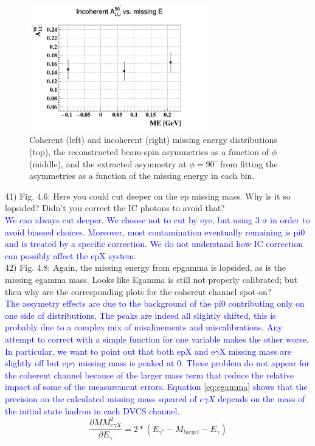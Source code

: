 \begin{figure}[tbp]
   \hspace{+0.7cm}
   \includegraphics[height=5.5cm]{fig/incoh_ME_alpha.png}


   \caption{Coherent (left) and incoherent (right) missing energy distributions 
   (top), the reconstructed beam-spin asymmetries as a function of $\phi$ 
(middle), and the extracted asymmetry at $\phi = 90 ^{\circ}$ from fitting the 
asymmetries as a function of the missing energy in each bin. }
   \label{fig:coherent_ME_bins}
    \end{figure}

41) Fig. 4.6: Here you could cut deeper on the ep missing mass.
Why is it so lopsided? Didn't you correct the IC photons to avoid that?  \\
\textcolor{blue}{We can always cut deeper. We choose not to cut by eye, but 
   using 3 $\sigma$ in order to avoid biassed choices. Moreover, most 
   contamination eventually remaining is pi0 and is treated by a specific 
correction. We do not understand how IC correction can possibly affect the epX 
system.}\\

42) Fig. 4.8: Again, the missing energy from epgamma is lopsided, as is the 
missing egamma mass. Looks like Egamma is still not properly calibrated; but 
then why are the corresponding plots for the coherent channel spot-on? \\
\textcolor{blue}{The assymetry effects are due to the background of the pi0
contributing only on one side of distributions. The peaks are indeed all 
slightly shifted, this is probably due to a complex mix of misalinements and 
miscalibrations. Any attempt to correct with a simple function for one 
variable makes the other worse. In particular, we want to point out that both 
epX and e$\gamma$X missing mass are slightly off but ep$\gamma$ missing mass 
is peaked at 0. These problem do not appear for the coherent channel because
of the larger mass term that reduce the relative impact of some of the
measurement errors. Equation \ref{eq:egamma} shows that the precision on the 
calculated missing mass squared of $e\gamma X$ depends on the mass of the 
initial state hadron in each DVCS channel.}\\
   \begin{equation}
      \frac{\partial MM^2_{e\gamma X}}{\partial E_{\gamma}}
      = 2*(E_{\gamma^{*}}-M_{target} - E_{\gamma})
      \label{eq:egamma}
   \end{equation}

